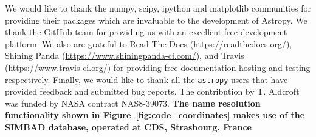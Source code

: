 \documentclass[traditabstract]{aa}
\newcommand{\astropy}{\texttt{astropy}\xspace}
\begin{document}
We would like to thank the \gls{numpy}, \gls{scipy}, \gls{ipython} and
\gls{matplotlib} communities for providing their packages which are invaluable
to the development of Astropy. We thank the GitHub team for providing us with
an excellent free development platform. We also are grateful to Read The Docs
(\url{https://readthedocs.org/}), Shining Panda
(\url{https://www.shiningpanda-ci.com/}), and Travis
(\url{https://www.travis-ci.org/}) for providing free documentation
hosting and testing respectively. Finally, we would like to thank all the
\astropy users that have provided feedback and submitted bug reports.
The contribution by T. Aldcroft was funded by NASA contract NAS8-39073.
\textbf{The name resolution functionality shown in
Figure~\ref{fig:code_coordinates} makes use of the SIMBAD database, operated
at CDS, Strasbourg, France}



\end{document}
